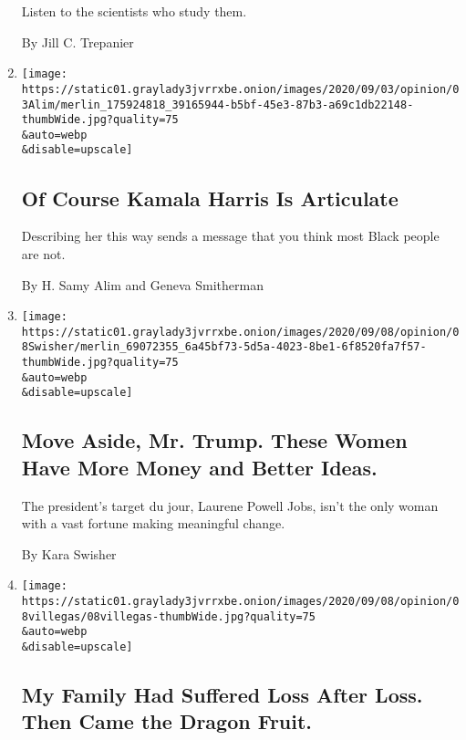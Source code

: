\begin{enumerate}
  Listen to the scientists who study them.

  By Jill C. Trepanier
\item
  \href{/2020/09/08/opinion/kamala-harris-articulate.html}{}

  \texttt{[image: https://static01.graylady3jvrrxbe.onion/images/2020/09/03/opinion/03Alim/merlin\_175924818\_39165944-b5bf-45e3-87b3-a69c1db22148-thumbWide.jpg?quality=75\\\&auto=webp\\\&disable=upscale]}

  \hypertarget{of-course-kamala-harris-is-articulate}{%
  \subsection{Of Course Kamala Harris Is
  Articulate}\label{of-course-kamala-harris-is-articulate}}

  Describing her this way sends a message that you think most Black
  people are not.

  By H. Samy Alim and Geneva Smitherman
\item
  \href{/2020/09/08/opinion/trump-powell-jobs-atlantic.html}{}

  \texttt{[image: https://static01.graylady3jvrrxbe.onion/images/2020/09/08/opinion/08Swisher/merlin\_69072355\_6a45bf73-5d5a-4023-8be1-6f8520fa7f57-thumbWide.jpg?quality=75\\\&auto=webp\\\&disable=upscale]}

  \hypertarget{move-aside-mr-trump-these-women-have-more-money-and-better-ideas}{%
  \subsection{Move Aside, Mr. Trump. These Women Have More Money and
  Better
  Ideas.}\label{move-aside-mr-trump-these-women-have-more-money-and-better-ideas}}

  The president's target du jour, Laurene Powell Jobs, isn't the only
  woman with a vast fortune making meaningful change.

  By Kara Swisher
\item
  \href{/2020/09/08/opinion/costa-rica-climate-change.html}{}

  \texttt{[image: https://static01.graylady3jvrrxbe.onion/images/2020/09/08/opinion/08villegas/08villegas-thumbWide.jpg?quality=75\\\&auto=webp\\\&disable=upscale]}

  \hypertarget{my-family-had-suffered-loss-after-loss-then-came-the-dragon-fruit}{%
  \subsection{My Family Had Suffered Loss After Loss. Then Came the
  Dragon
  Fruit.}\label{my-family-had-suffered-loss-after-loss-then-came-the-dragon-fruit}}


\end{enumerate}

